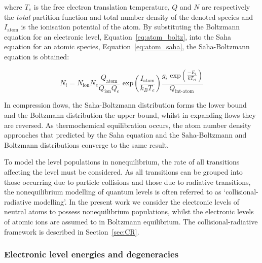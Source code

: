 \noindent where $T_e$ is the free electron translation temperature, $Q$ and $N$ are respectively the \textit{total} partition function and total number density of the denoted species  and $I_\text{atom}$ is the ionisation potential of the atom.
By substituting the Boltzmann equation for an electronic level, Equation~\ref{eq:atom_boltz}, into the Saha equation for an atomic species, Equation~\ref{eq:atom_saha}, the Saha-Boltzmann equation is obtained:

\begin{equation}
 N_i =  N_\text{ion} N_e \frac{ Q_\text{atom} }{ Q_\text{ion} Q_e }  \text{~exp} \left ( \frac{I_\text{atom}}{k_B T_e} \right ) \frac{ g_i \text{~exp} \left ( \frac{-E_i}{kT_\text{el}} \right ) }{ Q_\text{int-atom } } \label{eq:atom_saha}
\end{equation} 

In compression flows, the Saha-Boltzmann distribution forms the lower bound and the Boltzmann distribution the upper bound, whilst in expanding flows they are reversed.
As thermochemical equilibration occurs, the atom number density approaches that predicted by the Saha equation and the Saha-Boltzmann and Boltzmann distributions converge to the same result.

\par

To model the level populations in nonequilibrium, the rate of all transitions affecting the level must be considered.
As all transitions can be grouped into those occurring due to particle collisions and those due to radiative transitions, the nonequilibrium modelling of quantum levels is often referred to as `collisional-radiative modelling'.
In the present work we consider the electronic levels of neutral atoms to possess nonequilibrium populations, whilst the electronic levels of atomic ions are assumed to in Boltzmann equilibrium.
The collisional-radiative framework is described in Section~\ref{sec:CR}.

\subsubsection{Electronic level energies and degeneracies}

